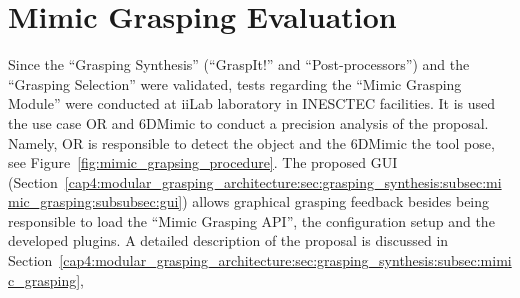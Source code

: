\section{Mimic Grasping Evaluation}
\label{cap5:mimic_grasping_evaluation}

Since the ``Grasping Synthesis'' (``GraspIt!'' and ``Post-processors'') and the ``Grasping Selection'' were validated, tests regarding the ``Mimic Grasping Module''  were conducted at iiLab laboratory in INESCTEC facilities. It is used the use case \ac{OR} and 6DMimic to conduct a precision analysis of the proposal. Namely,  \ac{OR} is responsible to detect the object and the 6DMimic the tool pose, see Figure~\ref{fig:mimic_grapsing_procedure}.  The proposed GUI (Section~\ref{cap4:modular_grasping_architecture:sec:grasping_synthesis:subsec:mimic_grasping:subsubsec:gui}) allows graphical grasping feedback besides being responsible to load the ``Mimic Grasping API'', the configuration setup and the developed plugins. A detailed description of the proposal is discussed in Section~\ref{cap4:modular_grasping_architecture:sec:grasping_synthesis:subsec:mimic_grasping}, 


